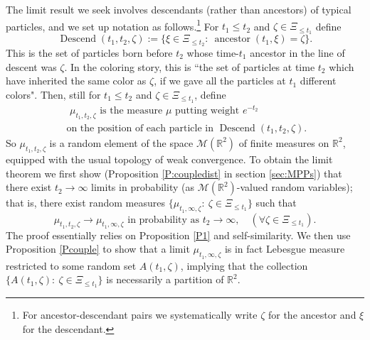 \documentclass[12pt]{article}
\newcommand{\MM}{\mbox{${\mathcal M}$}}
\newcommand{\Reals}{{\mathbb{R}}}
\newcommand{\bZ}{\mathbf{Z}}
\DeclareMathOperator{\ancestor}{ancestor}
\DeclareMathOperator{\descend}{Descend}
\begin{document}
The limit result we seek involves descendants (rather than ancestors) of typical particles,
and we set up notation as follows.\footnote{For ancestor-descendant pairs we systematically write $\zeta$ for the ancestor and $\xi$ for the descendant.}  
For $t_1 \le t_2$ and $\zeta \in \Xi_{\le t_1}$ define 
\begin{equation} 
\descend(t_1,t_2,\zeta):= 
\{\xi \in \Xi_{\le t_2}: \ \ancestor(t_1, \xi) = \zeta\} .
\label{def:descend}
\end{equation}
This is the set of particles born before $t_2$ whose time-$t_1$ ancestor in the line of descent was $\zeta$. 
In the coloring story, this is ``the set of particles at time $t_2$ which have inherited the same color 
as $\zeta$, if we gave all the particles at $t_1$ different colors". 
Then, still for $t_1  \le t_2$ and $\zeta \in \Xi_{\le t_1}$, define 
\begin{eqnarray}
 \mbox{ $\mu_{t_1,t_2,\zeta}$ 
is the measure $\mu$ putting weight $e^{-t_2}$} \nonumber\\
\mbox{  on the position of each particle in $\descend(t_1,t_2,\zeta)$.} \label{def:mu}
\end{eqnarray}
So $\mu_{t_1,t_2,\zeta}$ is a random  element of the space  
$\MM(\Reals^2)$ of finite measures on $\Reals^2$, equipped with the usual topology of weak convergence. 
To obtain the limit theorem  we first show (Proposition \ref{P:coupledist} in section \ref{sec:MPPs})   that there exist $t_2 \to \infty$ limits in probability (as $\MM(\Reals^2)$-valued random variables); that is, there exist random measures  $\{ \mu_{t_1,\infty,\zeta}:  \    \zeta \in  \Xi_{\le t_1}  \} $ such that
\begin{equation}
 \mu_{t_1,t_2,\zeta} \to \mu_{t_1,\infty,\zeta} \mbox{ in probability as } t_2 \to \infty, \quad (\forall \zeta \in  \Xi_{\le t_1} ) . 
 \label{mtt12}
 \end{equation}
 The proof essentially relies on Proposition \ref{P1} and self-similarity.
 We then use Proposition  \ref{Pcouple} to show that a limit $ \mu_{t_1,\infty,\zeta}$ is in fact Lebesgue measure restricted to some random set 
 $A(t_1,\zeta)$, implying that the collection $\{A(t_1,\zeta): \ \zeta \in \Xi_{\le t_1} \}$ is necessarily  a partition of $\Reals^2$.
 
\end{document}
